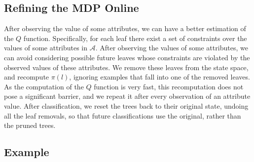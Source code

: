 \documentclass[letterpaper]{article}
\theoremstyle{definition}
\begin{document}
\subsection{Refining the MDP Online}
\label{sec:RefineMDP}

After observing the value of some attributes, we can have a better estimation of the $Q$ function. Specifically, for each leaf there exist a set of constraints over the values of some attributes in $\mathcal{A}$.
After observing the values of some attributes, we can avoid considering possible future leaves whose constraints are violated by the observed values of these attributes. We remove these leaves from the state space, and recompute $\pi(l)$, ignoring examples that fall into one of the removed leaves. As the computation of the $Q$ function is very fast, this recomputation does not pose a significant barrier, and we repeat it after every observation of an attribute value. After classification, we reset the trees back to their original state, undoing all the leaf removals, so that future classifications use the original, rather than the pruned trees.












\subsection{Example}
\end{document}
